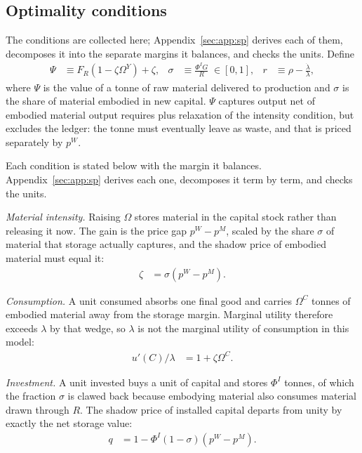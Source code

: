 \subsection{Optimality conditions}\label{sec:sp:opt:foc}

The conditions are collected here; Appendix~\ref{sec:app:sp} derives each of them, decomposes it into the separate margins it balances, and checks the units. Define
\begin{align}
\Psi &\equiv F_R\left(1-\zeta\Omega^Y\right)+\zeta,
&
\sigma &\equiv \frac{\Phi^IG}{R}\;\in\left[0,1\right],
&
r &\equiv \rho-\frac{\dot\lambda}{\lambda},
\label{eq:sp:shorthand}
\end{align}
where $\Psi$ is the value of a tonne of raw material delivered to production and $\sigma$ is the share of material embodied in new capital. $\Psi$ captures output net of embodied material output requires plus relaxation of the intensity condition, but excludes the ledger: the tonne must eventually leave as waste, and that is priced separately by $p^W$.

 Each condition is stated below with the margin it balances. Appendix~\ref{sec:app:sp} derives each one, decomposes it term by term, and checks the units.

\emph{Material intensity.} Raising $\Omega$ stores material in the capital stock rather than releasing it now. The gain is the price gap $p^W-p^M$, scaled by the share $\sigma$ of material that storage actually captures, and the shadow price of embodied material must equal it:
\begin{align}
\zeta &= \sigma\left(p^W-p^M\right).
\label{eq:sp:sum:Omega}
\end{align}

\emph{Consumption.} A unit consumed absorbs one final good and carries $\Omega^C$ tonnes of embodied material away from the storage margin. Marginal utility therefore exceeds $\lambda$ by that wedge, so $\lambda$ is not the marginal utility of consumption in this model:
\begin{align}
u'\left(C\right)/\lambda &= 1+\zeta\Omega^C .
\label{eq:sp:sum:C}
\end{align}

\emph{Investment.} A unit invested buys a unit of capital and stores $\Phi^I$ tonnes, of which the fraction $\sigma$ is clawed back because embodying material also consumes material drawn through $R$. The shadow price of installed capital departs from unity by exactly the net storage value:
\begin{align}
q &= 1-\Phi^I\left(1-\sigma\right)\left(p^W-p^M\right).
\label{eq:sp:sum:I}
\end{align}


